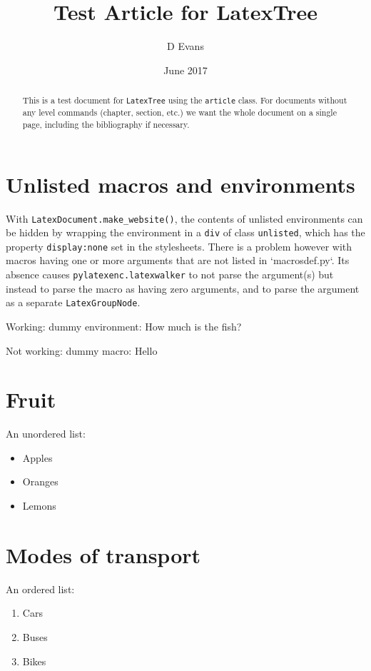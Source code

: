\documentclass{article}
\title{Test Article for LatexTree}
\author{D Evans}
\date{June 2017}
\newcommand{\dummymacro}[1]{#1}
\newenvironment{dummyenv}{}{}
\begin{document}
\label{article:latextreetest}
\maketitle

\begin{abstract}\noindent
This is a test document for {\tt LatexTree} using the {\tt article} class. For documents without any level commands (chapter, section, etc.) we want the whole document on a single page, including the bibliography if necessary.
\end{abstract}

\section*{Unlisted macros and environments}
With {\tt LatexDocument.make\_website()}, the contents of unlisted environments can be hidden by wrapping the environment in a {\tt div} of class {\tt unlisted}, which has the property {\tt display:none} set in the stylesheets. There is a problem however with macros having one or more arguments that are not listed in `macrosdef.py`. Its absence causes {\tt pylatexenc.latexwalker} to not parse the argument(s) but instead to parse the macro as having zero arguments, and to parse the argument as a separate {\tt LatexGroupNode}.

Working: dummy environment:
\begin{dummyenv}
How much is the fish?
\end{dummyenv}

Not working: dummy macro: \dummymacro{Hello}

\section*{Fruit}
An unordered list:
\begin{itemize}
\item Apples
\item Oranges
\item Lemons
\end{itemize}

\section*{Modes of transport}
An ordered list:
\begin{enumerate}
\item Cars
\item Buses
\item Bikes
\end{enumerate}

\nocite{*}


\end{document}
